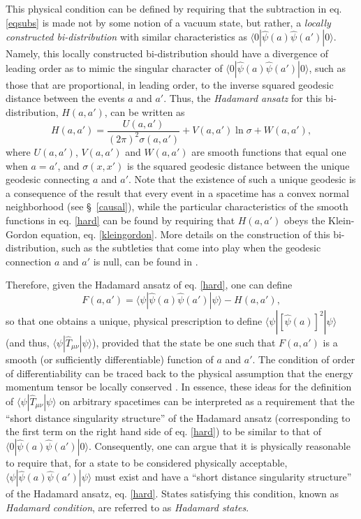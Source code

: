 \documentclass[
12pt,		%
openright,	%
twoside,  %
a4paper,			%
chapter=TITLE,		%
english,			%
french,				%
spanish,			%
brazil				%
]{USPSC-classe/USPSC}
\begin{document}
This physical condition can be defined by requiring that the subtraction in eq. \ref{eqsubs} is made not by some notion of a vacuum state, but rather, a \textit{locally constructed bi-distribution} with similar characteristics as $\langle0|\hat{\psi}(a)\hat{\psi}(a')|0\rangle$. Namely, this locally constructed bi-distribution should have a divergence of leading order as to mimic the singular character of $\langle0|\hat{\psi}(a)\hat{\psi}(a')|0\rangle$, such as those that are proportional, in leading order, to the inverse squared geodesic distance between the events $a$ and $a'$. Thus, the \textit{Hadamard ansatz} for this bi-distribution, $H(a,a')$, can be written as
\begin{equation}\label{hard}
    H(a,a')=\frac{U(a,a')}{(2\pi)^2\sigma(a,a')}+V(a,a')\ln{\sigma}+W(a,a'),
\end{equation}
where $U(a,a')$, $V(a,a')$ and $W(a,a')$ are smooth functions that equal one when $a=a'$, and $\sigma(x,x')$ is the squared geodesic distance between the unique geodesic connecting $a$ and $a'$. Note that the existence of such a unique geodesic is a consequence of the result that every event in a spacetime has a convex normal neighborhood (see \S~\ref{causal}), while the particular characteristics of the smooth functions in eq. \ref{hard} can be found by requiring that $H(a,a')$ obeys the Klein-Gordon equation, eq. \ref{kleingordon}. More details on the construction of this bi-distribution, such as the subtleties that come into play when the geodesic connection $a$ and $a'$ is null, can be found in \cite{Wald1994}. 

Therefore, given the Hadamard ansatz of eq. \ref{hard}, one can define
\begin{equation}\label{32}
    F(a,a')=\langle \psi|\hat{\psi}(a)\hat{\psi}(a')|\psi\rangle-H(a,a'),
\end{equation}
so that one obtains a unique, physical prescription to define $\langle \psi|[\hat{\psi}(a)]^2|\psi\rangle$ (and thus, $\langle \psi|\hat{T}_{\mu\nu}|\psi\rangle$), provided that the state be one such that $F(a,a')$ is a smooth (or sufficiently differentiable) function of $a$ and $a'$. The condition of order of differentiability can be traced back to the physical assumption that the energy momentum tensor be locally conserved \cite{Wald1994}. In essence, these ideas for the definition of $\langle \psi|\hat{T}_{\mu\nu}|\psi\rangle$ on arbitrary spacetimes can be interpreted as a requirement that the ``short distance singularity structure'' of the Hadamard ansatz (corresponding to the first term on the right hand side of eq. \ref{hard}) to be similar to that of $\langle0|\hat{\psi}(a)\hat{\psi}(a')|0\rangle$. Consequently, one can argue that it is physically reasonable to require that, for a state to be considered physically acceptable, $\langle \psi|\hat{\psi}(a)\hat{\psi}(a')|\psi\rangle$ must exist and have a ``short distance singularity structure'' of the Hadamard ansatz, eq. \ref{hard}. States satisfying this condition, known as \textit{Hadamard condition}, are referred to as \textit{Hadamard states}. 
\end{document}
